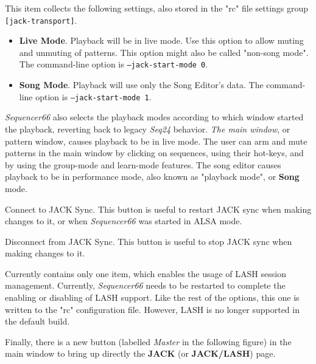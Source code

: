    This item collects the following settings, also stored in the "rc" file
   settings group \texttt{[jack-transport]}.

   \begin{itemize}
      \item \textbf{Live Mode}.
         Playback will be in live mode.  Use this option to allow muting and
         unmuting of patterns.  This option might also be called "non-song
         mode".
         The command-line option is \texttt{--jack-start-mode 0}.
      \item \textbf{Song Mode}.
         Playback will use only the Song Editor's data.
         The command-line option is \texttt{--jack-start-mode 1}.
   \end{itemize}

   \textsl{Sequencer66} also selects the playback modes
   according to which window started the playback,
   reverting back to legacy \textsl{Seq24} behavior.
   \textsl{The main window}, or pattern
   window, causes playback to be in live mode.  The user can arm and mute
   patterns in the main window by clicking on sequences, using their hot-keys,
   and by using the group-mode and learn-mode features.
   The song editor causes playback to be in performance mode, also known as
   "playback mode", or \textbf{Song} mode.

   Connect to JACK Sync.
   This button is useful to restart JACK sync when making changes to it,
   or when \textsl{Sequencer66} was started in ALSA mode.

   Disconnect from JACK Sync.
   This button is useful to stop JACK sync when making changes to it.

   Currently contains only one item, which enables the usage of LASH session
   management.  Currently, \textsl{Sequencer66} needs to be restarted to
   complete the enabling or disabling of LASH support.  Like the rest of the
   options, this one is written to the "rc" configuration file.
   However, LASH is no longer supported in the default build.

   Finally, there is a new button (labelled \textsl{Master} in the following
   figure) in the main window to bring up directly the
   \textbf{JACK} (or \textbf{JACK/LASH}) page.

